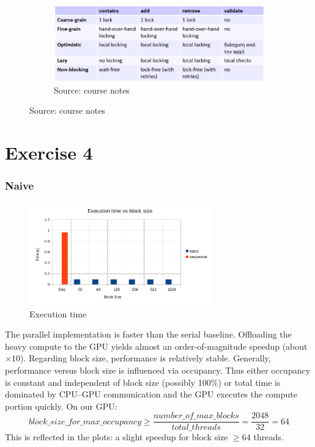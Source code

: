 \documentclass{article}
\newcommand{\eng}[1]{#1}
\begin{document}
\begin{figure}
    \centering
    \ContinuedFloat
    \begin{subfigure}{0.8\textwidth}
        \includegraphics[width=\textwidth]{a3/plots/comparing_screenshots.png}
        \caption{Source: course notes}
    \end{subfigure}
\end{figure}

\clearpage
\part{Exercise 4}

\section{\eng{Naive}}
\begin{figure}[h]\centering
        \includegraphics[width=0.7\textwidth]{a4/plots/kmeans_seq_vs_naive.png}
        \caption{Execution time}
\end{figure}\FloatBarrier

The parallel implementation is faster than the serial baseline. Offloading the heavy compute to the \eng{GPU} yields almost an order-of-magnitude speedup (about $\times 10$). Regarding \eng{block} size, performance is relatively stable. Generally, performance versus \eng{block size} is influenced via \eng{occupancy}. Thus either occupancy is constant and independent of \eng{block size} (possibly 100\%) or total time is dominated by CPU–GPU communication and the GPU executes the compute portion quickly. On our GPU:
\begin{equation}
\eng{block\_size\_for\_max\_occupancy} \ge 
\frac{\eng{number\_of\_max\_blocks}}{\eng{total\_threads}} = \frac{2048}{32} = 64
\end{equation}
This is reflected in the plots: a slight speedup for \eng{block size} $\ge 64$ threads.
\end{document}
